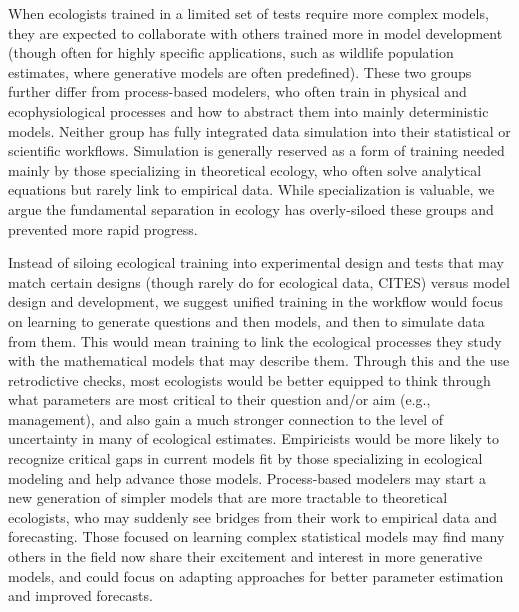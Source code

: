 \documentclass[11pt]{article}
\begin{document}
When ecologists trained in a limited set of tests require more complex models, they are expected to collaborate with others trained more in model development (though often for highly specific applications, such as wildlife population estimates, where generative models are often predefined). These two groups further differ from process-based modelers, who often train in physical and ecophysiological processes and how to abstract them into mainly deterministic models. %
Neither group has fully integrated data simulation into their statistical or scientific workflows. Simulation is generally reserved as a form of training needed mainly by those specializing in theoretical ecology, who often solve analytical equations but rarely link to empirical data. While specialization is valuable, we argue the fundamental %
separation in ecology has overly-siloed these groups and prevented more rapid progress.

Instead of siloing ecological training into experimental design and tests that may match certain designs (though rarely do for ecological data, CITES) versus model design and development, we suggest unified training in the workflow would focus on learning to generate questions and then models, and then to simulate data from them. This would mean training to link the ecological processes they study with the mathematical models that may describe them. Through this and the use retrodictive checks, most ecologists would be better equipped to think through what parameters are most critical to their question and/or aim (e.g., management), and also gain a much stronger connection to the level of uncertainty in many of ecological estimates. Empiricists %
 would be more likely to recognize critical gaps in current models fit by those specializing in ecological modeling and help advance those models. Process-based modelers may start a new generation of simpler models that are more tractable to theoretical ecologists, who may suddenly see bridges from their work to empirical data and forecasting.
Those focused on learning complex statistical models may find many others in the field now share their excitement and interest in more generative models, and could focus on adapting approaches for better parameter estimation and improved forecasts.
\end{document}
